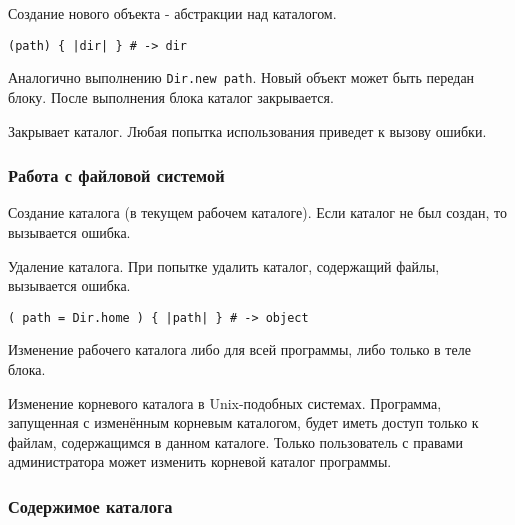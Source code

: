 \begin{methodlist}
  Создание нового объекта - абстракции над каталогом. 

  \verb!(path) { |dir| } # -> dir!

  Аналогично выполнению \verb!Dir.new path!. Новый объект может быть передан блоку. После выполнения блока каталог закрывается.

  Закрывает каталог. Любая попытка использования приведет к вызову ошибки. 
\end{methodlist}

\subsubsection*{Работа с файловой системой}

\begin{methodlist}
  Создание каталога (в текущем рабочем каталоге). Если каталог не был создан, то вызывается ошибка.

  Удаление каталога. При попытке удалить каталог, содержащий файлы, вызывается ошибка.

  \verb!( path = Dir.home ) { |path| } # -> object!

  Изменение рабочего каталога либо для всей программы, либо только в теле блока.

  Изменение корневого каталога в Unix-подобных системах. Программа, запущенная с изменённым корневым каталогом, будет иметь доступ только к файлам, содержащимся в данном каталоге. Только пользователь с правами администратора может изменить корневой каталог программы.
\end{methodlist}

\subsubsection*{Содержимое каталога}

